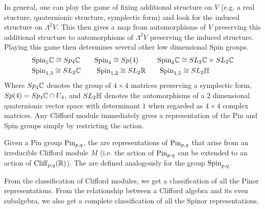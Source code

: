 In general, one can play the game of fixing additional structure on $V$
(e.g. a real stucture, quaternionic structure, symplectic form) and look
for the induced structure on $\Lambda^2V$. This then gives a map from
automorphisms of $V$ preserving this additional structure to automorphisms
of $\Lambda^2V$ preserving the induced structure. Playing this game then
determines several other low dimensional Spin groups.
%
\begin{align*}
&\mathrm{Spin}_5\mathbb{C} \cong Sp_4\mathbb{C} \qquad\mathrm{Spin}_4 \cong Sp(4) \qquad\:\:\:\mathrm{Spin}_4\mathbb{C} \cong SL_2\mathbb{C} \times
SL_2\mathbb{C} \\
&\mathrm{Spin}_{1,3} \cong SL_2\mathbb{C} \qquad\: \mathrm{Spin}_{1,2} \cong SL_2\mathbb{R} \qquad\mathrm{Spin}_{1,5} \cong SL_2\mathbb{H}
\end{align*}
%
Where $Sp_4\mathbb{C}$ denotes the group of $4\times4$ matrices preserving a symplectic
form, $Sp(4) = Sp_4\mathbb{C} \cap U_4$, and $SL_2\mathbb{H}$ denotes the automorphisms of a
$2$ dimensional quaternionic vector space with determinant $1$ when regarded
as $4 \times 4$ complex matrices.
%
Any Clifford module immediately gives a representation of the Pin and Spin
groups simply by restricting the action.
%
\begin{defn}
Given a Pin group $\mathrm{Pin}_{p,q}$, the  are representations
of $\mathrm{Pin}_{p,q}$ that arise from an irreducible Clifford module $M$ (i.e. the
action of $\mathrm{Pin}_{p,q}$ can be extended to an action of $\operatorname{Cliff}_{p,q}(\mathbb{R})$). The
 are defined analogously for the group $\mathrm{Spin}_{p,q}$.
\end{defn}
%
From the classification of Clifford modules, we get a classification of
all the Pinor representations. From the relationship between a Clifford
algebra and its even subalgebra, we also get a complete classification of all
the Spinor representations.
%
